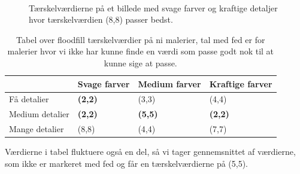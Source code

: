 \begin{figure}[!h]
    \centering
    \\
    \caption[]{Tærskelværdierne på et billede med svage farver og
	kraftige detaljer hvor tærskelværdien (8,8) passer bedst.}
    \label{Floodfillbilledet}
\end{figure}

\begin{table}[!h]
    \centering
    \begin{tabular}{| l | l | l | l |} \hline
        & Svage farver 		& Medium farver & Kraftige farver \\ \hline
        Få detalier 		& \textbf{(2,2)}	& (3,3)			& (4,4)\\ \hline
        Medium detalier 	& \textbf{(2,2)}	& \textbf{(5,5)}& \textbf{(2,2)}\\ \hline
        Mange detalier		& (8,8)				& (4,4)			& (7,7)\\ \hline
    \end{tabular}
    \caption{Tabel over floodfill tærskelværdier på ni malerier, tal med
    fed er for malerier hvor vi ikke har kunne finde en værdi som passe
    godt nok til at kunne sige at passe.}
    \label{thressholdsTabelFF}
\end{table}

Værdierne i tabel fluktuere også en del, så vi tager
gennemsnittet af værdierne, som ikke er markeret med fed og får en tærskelværdierne på (5,5).
